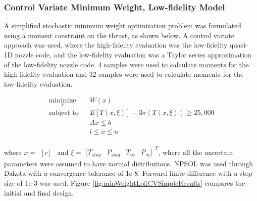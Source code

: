 \documentclass{article}
\newcommand{\irow}[1]{%
  \begin{smallmatrix}[#1]\end{smallmatrix}%
}
\begin{document}
\subsubsection{Control Variate Minimum Weight, Low-fidelity Model}

A simplified stochastic minimum weight optimization problem was formulated using a moment constraint on the thrust, as shown below. A control variate approach was used, where the high-fidelity evaluation was the low-fidelity quasi-1D nozzle code, and the low-fidelity evaluation was a Taylor series approximation of the low-fidelity nozzle code. 4 samples were used to calculate moments for the high-fidelity evaluation and 32 samples were used to calculate moments for the low-fidelity evaluation. 
 
\begin{equation}
\label{eq:minWeightCVLowFiSimplified}
\begin{aligned}
& \underset{x}{\text{minimize}}
& & W(x) \\
& \text{subject to}
& & E[T(x,\xi)] - 3 \sigma(T(x,\xi)) \geq 25,000 \\
& & & A x \leq b \\
& & & l \leq x \leq u \\
\end{aligned}
\end{equation}

where $x = \irow{c}$ and $\xi = \irow{ T_{stag} & P_{stag} & T_{\infty} & P_{\infty} }^T$, where all the uncertain parameters were assumed to have normal distributions. NPSOL was used through Dakota with a convergence tolerance of 1e-8. Forward finite difference with a step size of 1e-3 was used. Figure \ref{fig:minWeightLofiCVSimpleResults} compares the initial and final design.
\end{document}
